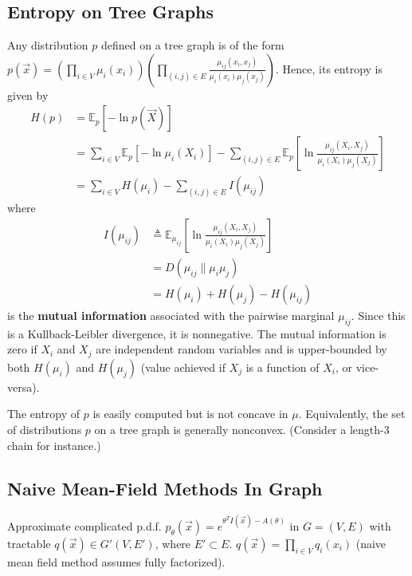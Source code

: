 \documentclass[11pt]{elegantbook}
\begin{document}
\subsection{Entropy on Tree Graphs}
Any distribution $p$ defined on a tree graph is of the form $p(\vec{x})=\left(\prod_{i \in V} \mu_i\left(x_i\right)\right)\left(\prod_{(i, j) \in E} \frac{\mu_{i j}\left(x_i, x_j\right)}{\mu_i\left(x_i\right) \mu_j\left(x_j\right)}\right)$. Hence, its entropy is given by
$$
\begin{aligned}
H(p) &=\mathbb{E}_p[-\ln p(\vec{X})] \\
&=\sum_{i \in V} \mathbb{E}_p\left[-\ln \mu_i\left(X_i\right)\right]-\sum_{(i, j) \in E} \mathbb{E}_p\left[\ln \frac{\mu_{i j}\left(X_i, X_j\right)}{\mu_i\left(X_i\right) \mu_j\left(X_j\right)}\right] \\
&=\sum_{i \in V} H\left(\mu_i\right)-\sum_{(i, j) \in E} I\left(\mu_{i j}\right)
\end{aligned}
$$
where
$$
\begin{aligned}
I\left(\mu_{i j}\right) & \triangleq \mathbb{E}_{\mu_{i j}}\left[\ln \frac{\mu_{i j}\left(X_i, X_j\right)}{\mu_i\left(X_i\right) \mu_j\left(X_j\right)}\right] \\
&=D\left(\mu_{i j} \| \mu_i \mu_j\right) \\
&=H\left(\mu_i\right)+H\left(\mu_j\right)-H\left(\mu_{i j}\right)
\end{aligned}
$$
is the \textbf{mutual information} associated with the pairwise marginal $\mu_{i j}$. Since this is a Kullback-Leibler divergence, it is nonnegative. The mutual information is zero if $X_i$ and $X_j$ are independent random variables and is upper-bounded by both $H\left(\mu_i\right)$ and $H\left(\mu_j\right)$ (value achieved if $X_j$ is a function of $X_i$, or vice-versa).

The entropy of $p$ is easily computed but is not concave in $\mu$. Equivalently, the set of distributions $p$ on a tree graph is generally nonconvex. (Consider a length-3 chain for instance.)


\subsection{Naive Mean-Field Methods In Graph}
Approximate complicated p.d.f. $p_\theta(\vec{x})=e^{\theta^T I(\vec{x})-A(\theta)}$ in $G=(V,E)$ with tractable $q(\vec{x})\in G'(V,E')$, where $E'\subset E$. $q(\vec{x})=\prod_{i\in V}q_i(x_i)$ (naive mean field method assumes fully factorized).
\end{document}
